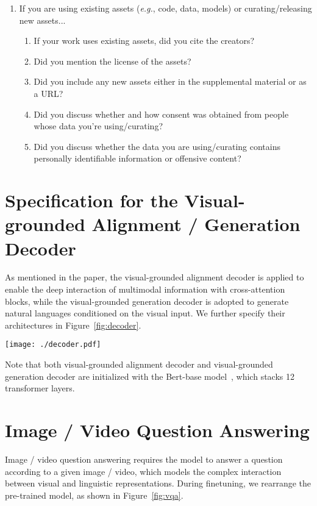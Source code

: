 \documentclass{article}
\makeatletter
\newcommand*{\eg}{\emph{e.g.}\@\xspace}
\makeatother
\begin{document}
\begin{enumerate}
\item If you are using existing assets (\eg, code, data, models) or curating/releasing new assets...
\begin{enumerate}
  \item If your work uses existing assets, did you cite the creators?
    \answerYes{}
  \item Did you mention the license of the assets?
    \answerNo{}
  \item Did you include any new assets either in the supplemental material or as a URL?
    \answerNo{}
  \item Did you discuss whether and how consent was obtained from people whose data you're using/curating?
    \answerNo{}
  \item Did you discuss whether the data you are using/curating contains personally identifiable information or offensive content?
    \answerNo{}
\end{enumerate}



\end{enumerate}


\appendix

\section{Specification for the Visual-grounded Alignment / Generation Decoder}
\label{sec:decoder}
As mentioned in the paper, the visual-grounded alignment decoder is applied to enable the deep interaction of multimodal information with cross-attention blocks, while the visual-grounded generation decoder is adopted to generate natural languages conditioned on the visual input. We further specify their architectures in Figure~\ref{fig:decoder}.

\begin{figure*}[!ht]
  \centering
  \texttt{[image: ./decoder.pdf]}
  \caption{Architecture of the visual-grounded alignment / generation decoder.}
  \label{fig:decoder}
\end{figure*}

Note that both visual-grounded alignment decoder and visual-grounded generation decoder are initialized with the Bert-base model~\cite{devlin2018bert}, which stacks 12 transformer layers.  

\section{Image / Video Question Answering}
Image / video question answering requires the model to answer a question according to a given image / video, which models the complex interaction between visual and linguistic representations. During finetuning, we rearrange the pre-trained model, as shown in Figure~\ref{fig:vqa}.
\end{document}
